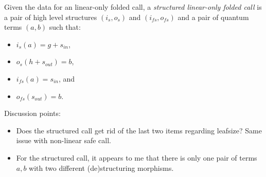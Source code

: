 \begin{definition}\label{def:structured_linear_folded_call}
  Given the data for an linear-only folded call, a \emph{structured linear-only folded call} is a
  pair of high level structures $(i_s,o_s)$ and $(i_{fs},o_{fs})$ and a pair of quantum terms
  $(a,b)$ such that:
  \begin{itemize}
    \item $i_s(a) = g + s_{in}$,
    \item $o_s(h + s_{out}) = b$,
    \item $i_{fs}(a) = s_{in}$, and
    \item $o_{fs}(s_{out}) = b$.
  \end{itemize}

\end{definition}

Discussion points:
\begin{itemize}
  \item Does the structured call get rid of the last two items regarding leafsize? Same issue with
  non-linear safe call.
  \item For the structured call, it appears to me that there is only one pair of terms $a,b$ with
  two different (de)structuring morphisms.
\end{itemize}


